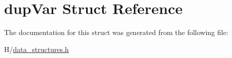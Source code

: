 \hypertarget{structdupVar}{
\section{dupVar Struct Reference}
\label{structdupVar}
}


The documentation for this struct was generated from the following file:\begin{DoxyCompactItemize}
\item 
H/\hyperlink{data__structures_8h}{data\_\-structures.h}\end{DoxyCompactItemize}
